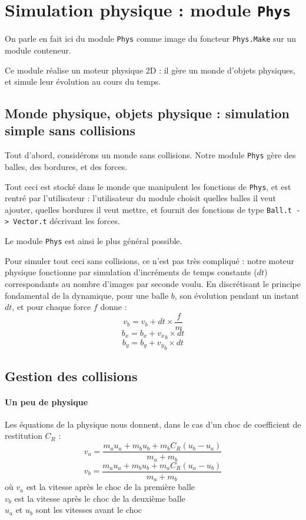 \documentclass[a4paper]{scrartcl}
\begin{document}
\section{Simulation physique : module \texttt{Phys}}
On parle en fait ici du module \texttt{Phys} comme image du foncteur
\texttt{Phys.Make} sur un module conteneur.

Ce module réalise un moteur physique 2D : il gère un monde d'objets
physiques, et simule leur évolution au cours du temps.
\subsection{Monde physique, objets physique : simulation simple sans
  collisions}
Tout d'abord, considérons un monde sans collisions. Notre module
\texttt{Phys} gère des balles, des bordures, et des forces.

Tout ceci est stocké dans le monde que manipulent les fonctions de
\texttt{Phys}, et est rentré par l'utilisateur : l'utilisateur du
module choisit quelles balles il veut ajouter, quelles bordures il
veut mettre, et fournit des fonctions de type \texttt{Ball.t ->
  Vector.t} décrivant les forces. 

Le module \texttt{Phys} est ainsi le plus général possible.

Pour simuler tout ceci sans collisions, ce n'est pas très compliqué :
notre moteur physique fonctionne par simulation d'incréments de temps
constants ($dt$) correspondants au nombre d'images par seconde voulu.
En discrétisant le principe fondamental de la dynamique, pour une
balle $b$, son évolution pendant un instant $dt$, et pour chaque force
$f$ donne :
\[
v_b = v_b + dt \times \frac{f}{m}
\]\[
b_x = b_x + {v_x}_b \times dt
\]\[
b_y = b_y + {v_y}_b \times dt 
\]

\subsection{Gestion des collisions}
\paragraph{Un peu de physique}

Les équations de la physique nous donnent, dans le cas d'un choc de
coefficient de restitution $C_R$ :
\[
v_a = \frac{m_a u_a + m_b u_b + m_b C_R (u_b - u_a)}{m_a + m_b}
\]\[
v_b = \frac{m_a u_a + m_b u_b + m_a C_R (u_a - u_b)}{m_a + m_b}
\]
où
$v_a$ est la vitesse après le choc de la première balle\\
$v_b$ est la vitesse après le choc de la deuxième balle\\
$u_a$ et $u_b$ sont les vitesses avant le choc
\end{document}
